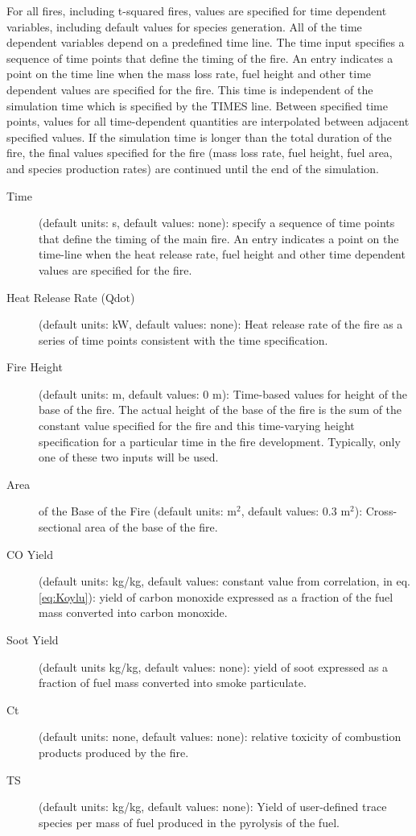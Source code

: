 For all fires, including t-squared fires, values are specified for time dependent variables, including default values for species generation. All of the time dependent variables depend on a predefined time line. The time input specifies a sequence of time points that define the timing of the fire.  An entry indicates a point on the time line when the mass loss rate, fuel height and other time dependent values are specified for the fire.  This time is independent of the simulation time which is specified by the TIMES line. Between specified time points, values for all time-dependent quantities are interpolated between adjacent specified values. If the simulation time is longer than the total duration of the fire, the final values specified for the fire (mass loss rate, fuel height, fuel area, and species production rates) are continued until the end of the simulation.

\begin{description}
\item[Time] (default units: s, default values: none): specify a sequence of time points that define the timing of the main fire.  An entry indicates a point on the time-line when the heat release rate, fuel height and other time dependent values are specified for the fire.

\item[Heat Release Rate (Qdot)] (default units: kW, default values: none): Heat release rate of the fire as a series of time points consistent with the time specification.

\item[Fire Height] (default units: m, default values: 0 m): Time-based values for height of the base of the fire.  The actual height of the base of the fire is the sum of the constant value specified for the fire and this time-varying height specification for a particular time in the fire development. Typically, only one of these two inputs will be used.

\item[Area] of the Base of the Fire (default units: m$^2$, default values: 0.3 m$^2$): Cross-sectional area of the base of the fire.

\item[CO Yield] (default units: kg/kg, default values: constant value from correlation, in eq. \ref{eq:Koylu}): yield of carbon monoxide expressed as a fraction of the fuel mass converted into carbon monoxide.

\item[Soot Yield] (default units kg/kg, default values: none): yield of soot expressed as a fraction of fuel mass converted into smoke particulate.

\item[Ct] (default units: none, default values: none): relative toxicity of combustion products produced by the fire.

\item[TS] (default units: kg/kg, default values: none): Yield of user-defined trace species per mass of fuel produced in the pyrolysis of the fuel.
\end{description}

